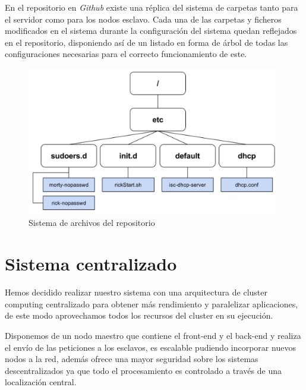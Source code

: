 En el repositorio en \textit{Github} existe una réplica del sistema de carpetas tanto para el servidor como para los nodos esclavo. Cada una de las carpetas y ficheros modificados en el sistema durante la configuración del sistema quedan reflejados en el repositorio, disponiendo así de un listado en forma de árbol de todas las configuraciones necesarias para el correcto funcionamiento de este.

\begin{figure}[H]
	\centering
  	\includegraphics[width=110mm]{pics/sistemadearchivos.PNG}
   	\caption[Sistema de archivos]{Sistema de archivos del repositorio}
   \label{figure3.1}
\end{figure}

\section{Sistema centralizado}
\label{makereference2.6}

Hemos decidido realizar nuestro sistema con una arquitectura de cluster computing centralizado para obtener más rendimiento y paralelizar aplicaciones, de este modo aprovechamos todos los recursos del cluster en su ejecución.

Disponemos de un nodo maestro que contiene el front-end y el back-end y realiza el envío de las peticiones a los esclavos, es escalable pudiendo incorporar nuevos nodos a la red, además ofrece una mayor seguridad sobre los sistemas descentralizados ya que todo el procesamiento es controlado a través de una localización central.


